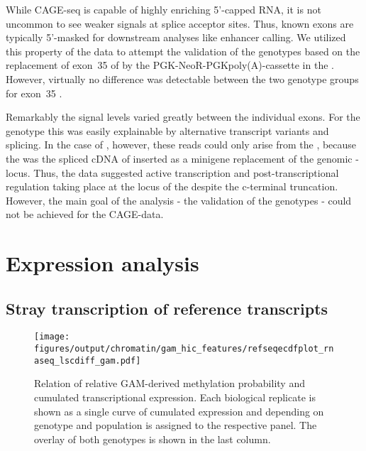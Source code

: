 While CAGE-seq is capable of highly enriching 5'-capped RNA, it is not uncommon to see weaker signals at splice acceptor sites. Thus, known exons are typically 5'-masked for downstream analyses like enhancer calling\cite{Andersson2014}. We utilized this property of the data to attempt the validation of the genotypes based on the replacement of exon~35 of  by the PGK-NeoR-PGKpoly(A)-cassette in the \dnmtcallele. However, virtually no difference was detectable between the two genotype groups for exon~35 . 

Remarkably the signal levels varied greatly between the individual exons. For the \dnmtwt genotype this was easily explainable by alternative transcript variants and splicing. In the case of \dnmtchip, however, these reads could only arise from the \dnmtcallele, because the \dnmtchipallele was the spliced cDNA of  inserted as a minigene replacement of the genomic -locus\cite{Tucker1996,Gaudet2003}. Thus, the data suggested active transcription and post-transcriptional regulation taking place at the locus of the \dnmtcallele despite the c-terminal truncation. However, the main goal of the analysis - the validation of the genotypes - could not be achieved for the CAGE-data. 

\section{Expression analysis}
\label{chap:r:transcription:expressionoverall}

\subsection{Stray transcription of reference transcripts}
\label{chap:r:transcription:strayreference}

\begin{figure}[!ht]
	\centering
	\texttt{[image: figures/output/chromatin/gam\_hic\_features/refseqecdfplot\_rnaseq\_lscdiff\_gam.pdf]} 
	\caption{Relation of relative GAM-derived methylation probability and cumulated transcriptional expression. Each biological replicate is shown as a single curve of cumulated expression and depending on genotype and population is assigned to the respective panel. The overlay of both genotypes is shown in the last column.} %
	\label{fig:refseqecdfplot_rnaseq_lscdiff_gam}
\end{figure}

